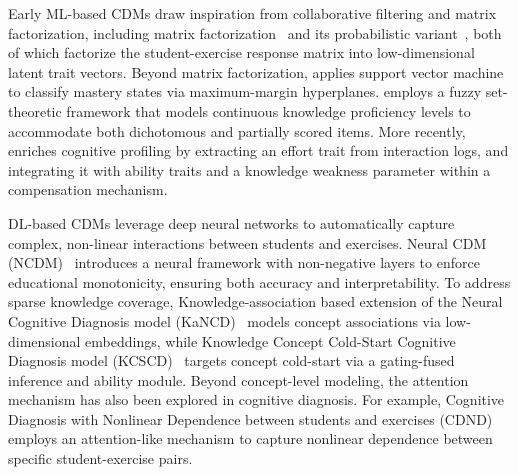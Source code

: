 \documentclass[runningheads]{llncs}
\begin{document}
Early ML-based CDMs draw inspiration from collaborative filtering and matrix factorization, including matrix factorization~\cite{MF} and its probabilistic variant~\cite{PMF}, both of which factorize the student-exercise response matrix into low-dimensional latent trait vectors. Beyond matrix factorization, \cite{SVM} applies support vector machine to classify mastery states via maximum-margin hyperplanes. \cite{FuzzyCDF} employs a fuzzy set-theoretic framework that models continuous knowledge proficiency levels to accommodate both dichotomous and partially scored items. More recently, \cite{MvCRF} enriches cognitive profiling by extracting an effort trait from interaction logs, and integrating it with ability traits and a knowledge weakness parameter within a compensation mechanism.


DL-based CDMs leverage deep neural networks to automatically capture complex, non-linear interactions between students and exercises. 
Neural CDM (NCDM)~\cite{wang2020neural} introduces a neural framework with non-negative layers to enforce educational monotonicity, ensuring both accuracy and interpretability.
To address sparse knowledge coverage, Knowledge-association based extension of the Neural Cognitive Diagnosis model (KaNCD)~\cite{wang2022neuralcd} models concept associations via low-dimensional embeddings, while Knowledge Concept Cold-Start Cognitive Diagnosis model  (KCSCD)~\cite{zhang2026knowledge} targets concept cold-start via a gating-fused inference and ability module. 
Beyond concept-level modeling, the attention mechanism has also been explored in cognitive diagnosis. For example, Cognitive Diagnosis with Nonlinear Dependence between students and exercises (CDND)~\cite{zhang2025cognitive} employs an attention-like mechanism to capture nonlinear dependence between specific student-exercise pairs. 

\end{document}

